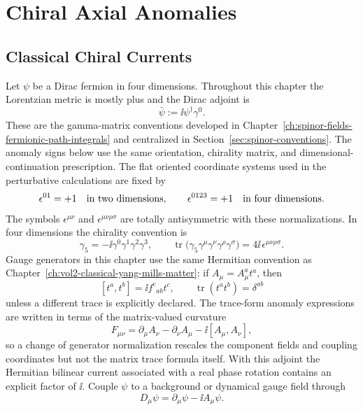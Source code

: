 \chapter{Chiral Axial Anomalies}
\label{ch:volume-ii-20}
\ConventionsLorentzian


\section{Classical Chiral Currents}

Let \(\psi\) be a Dirac fermion in four dimensions.  Throughout this chapter
the Lorentzian metric is mostly plus and the Dirac adjoint is
\[
  \bar\psi:=\ii\psi^\dagger\gamma^0 .
\]
These are the gamma-matrix conventions developed in
Chapter~\ref{ch:spinor-fields-fermionic-path-integrals} and centralized in
Section~\ref{sec:spinor-conventions}.  The anomaly signs below use the same
orientation, chirality matrix, and dimensional-continuation prescription.
The flat oriented coordinate systems used in the perturbative calculations are
fixed by
\[
  \epsilon^{01}=+1
  \quad\hbox{in two dimensions},
  \qquad
  \epsilon^{0123}=+1
  \quad\hbox{in four dimensions}.
\]
The symbols \(\epsilon^{\mu\nu}\) and \(\epsilon^{\mu\nu\rho\sigma}\) are
totally antisymmetric with these normalizations.  In four dimensions the
chirality convention is
\[
  \gamma_5=-\ii\gamma^0\gamma^1\gamma^2\gamma^3,
  \qquad
  \operatorname{tr}
  \bigl(\gamma_5\gamma^\mu\gamma^\nu\gamma^\rho\gamma^\sigma\bigr)
  =
  4\ii\,\epsilon^{\mu\nu\rho\sigma}.
\]
Gauge generators in this chapter use the same Hermitian convention as
Chapter~\ref{ch:vol2-classical-yang-mills-matter}: if
\(A_\mu=A_\mu^a t^a\), then
\[
  [t^a,t^b]=\ii f^c{}_{ab}t^c,
  \qquad
  \operatorname{tr}(t^a t^b)=\delta^{ab}
\]
unless a different trace is explicitly declared.  The trace-form anomaly
expressions are written in terms of the matrix-valued curvature
\[
  F_{\mu\nu}
  =
  \partial_\mu A_\nu-\partial_\nu A_\mu-\ii[A_\mu,A_\nu],
\]
so a change of generator normalization rescales the component fields and
coupling coordinates but not the matrix trace formula itself.
With this adjoint the Hermitian bilinear current associated with a real
phase rotation contains an explicit factor of \(\ii\).  Couple \(\psi\) to a
background or dynamical gauge field through
\[
  D_\mu\psi=\partial_\mu\psi-\ii A_\mu\psi .
\]

